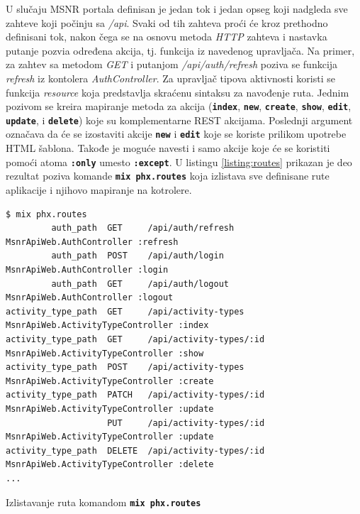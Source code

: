 \documentclass[12pt,oneside]{memoir}
\begin{document}
U slučaju MSNR portala definisan je jedan tok i jedan opseg koji nadgleda sve zahteve koji počinju sa \emph{/api}.
Svaki od tih zahteva proći će kroz prethodno definisani tok, nakon čega se na osnovu metoda \emph{HTTP} zahteva i nastavka
putanje pozvia određena akcija, tj. funkcija iz navedenog upravljača. Na primer, za zahtev sa metodom
\emph{GET} i putanjom \emph{/api/auth/refresh} poziva se funkcija \emph{refresh} iz kontolera 
\emph{AuthController}. Za upravljač tipova aktivnosti koristi se funkcija \emph{resource} koja
predstavlja skraćenu sintaksu za navođenje ruta. Jednim pozivom se kreira mapiranje metoda za akcija
(\texttt{\textbf{index}}, \texttt{\textbf{new}}, \texttt{\textbf{create}}, \texttt{\textbf{show}}, \texttt{\textbf{edit}},
\texttt{\textbf{update}}, i \texttt{\textbf{delete}}) koje su komplementarne REST akcijama. Poslednji argument označava da
će se izostaviti akcije \texttt{\textbf{new}} i \texttt{\textbf{edit}} koje se koriste prilikom upotrebe HTML šablona. Takođe je moguće
navesti i samo akcije koje će se koristiti pomoći atoma \texttt{\textbf{:only}} umesto \texttt{\textbf{:except}}. U listingu \ref{listing:routes}
prikazan je deo rezultat poziva komande \texttt{\textbf{mix phx.routes}} koja izlistava sve definisane rute aplikacije i njihovo mapiranje na kotrolere.
\begin{listing}[!h]
  \begin{verbatim}
$ mix phx.routes
         auth_path  GET     /api/auth/refresh        MsnrApiWeb.AuthController :refresh
         auth_path  POST    /api/auth/login          MsnrApiWeb.AuthController :login
         auth_path  GET     /api/auth/logout         MsnrApiWeb.AuthController :logout
activity_type_path  GET     /api/activity-types      MsnrApiWeb.ActivityTypeController :index
activity_type_path  GET     /api/activity-types/:id  MsnrApiWeb.ActivityTypeController :show
activity_type_path  POST    /api/activity-types      MsnrApiWeb.ActivityTypeController :create
activity_type_path  PATCH   /api/activity-types/:id  MsnrApiWeb.ActivityTypeController :update
                    PUT     /api/activity-types/:id  MsnrApiWeb.ActivityTypeController :update
activity_type_path  DELETE  /api/activity-types/:id  MsnrApiWeb.ActivityTypeController :delete
...
\end{verbatim}
\caption{Izlistavanje ruta komandom \texttt{\textbf{mix phx.routes}}}
\label{listing:routes}
\end{listing}
\end{document}
